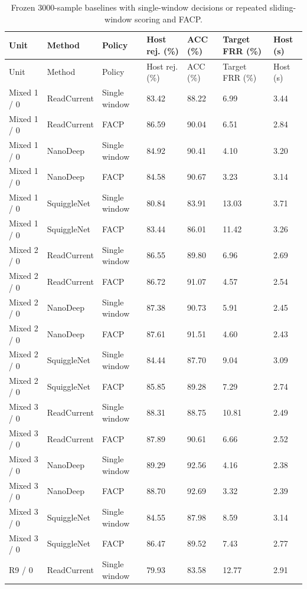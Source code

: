 \begin{longtable}{lllllll}
\caption{Frozen 3000-sample baselines with single-window decisions or repeated sliding-window scoring and FACP.}\label{tab:s_native_cp}\\
\toprule
Unit & Method & Policy & Host rej. (\%) & ACC (\%) & Target FRR (\%) & Host (s)\\\midrule\endfirsthead
\toprule
Unit & Method & Policy & Host rej. (\%) & ACC (\%) & Target FRR (\%) & Host (s)\\\midrule\endhead
\bottomrule\endfoot
Mixed 1 / 0 & ReadCurrent & Single window & 83.42 & 88.22 & 6.99 & 3.44\\
Mixed 1 / 0 & ReadCurrent & FACP & 86.59 & 90.04 & 6.51 & 2.84\\
Mixed 1 / 0 & NanoDeep & Single window & 84.92 & 90.41 & 4.10 & 3.20\\
Mixed 1 / 0 & NanoDeep & FACP & 84.58 & 90.67 & 3.23 & 3.14\\
Mixed 1 / 0 & SquiggleNet & Single window & 80.84 & 83.91 & 13.03 & 3.71\\
Mixed 1 / 0 & SquiggleNet & FACP & 83.44 & 86.01 & 11.42 & 3.26\\
Mixed 2 / 0 & ReadCurrent & Single window & 86.55 & 89.80 & 6.96 & 2.69\\
Mixed 2 / 0 & ReadCurrent & FACP & 86.72 & 91.07 & 4.57 & 2.54\\
Mixed 2 / 0 & NanoDeep & Single window & 87.38 & 90.73 & 5.91 & 2.45\\
Mixed 2 / 0 & NanoDeep & FACP & 87.61 & 91.51 & 4.60 & 2.43\\
Mixed 2 / 0 & SquiggleNet & Single window & 84.44 & 87.70 & 9.04 & 3.09\\
Mixed 2 / 0 & SquiggleNet & FACP & 85.85 & 89.28 & 7.29 & 2.74\\
Mixed 3 / 0 & ReadCurrent & Single window & 88.31 & 88.75 & 10.81 & 2.49\\
Mixed 3 / 0 & ReadCurrent & FACP & 87.89 & 90.61 & 6.66 & 2.52\\
Mixed 3 / 0 & NanoDeep & Single window & 89.29 & 92.56 & 4.16 & 2.38\\
Mixed 3 / 0 & NanoDeep & FACP & 88.70 & 92.69 & 3.32 & 2.39\\
Mixed 3 / 0 & SquiggleNet & Single window & 84.55 & 87.98 & 8.59 & 3.14\\
Mixed 3 / 0 & SquiggleNet & FACP & 86.47 & 89.52 & 7.43 & 2.77\\
R9 / 0 & ReadCurrent & Single window & 79.93 & 83.58 & 12.77 & 2.91\\

\end{longtable}
